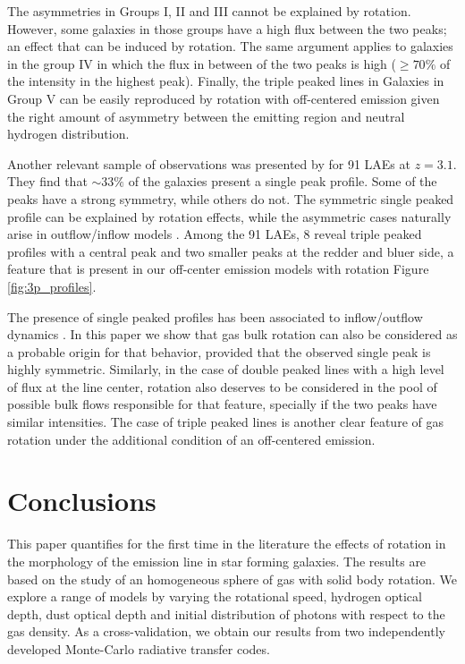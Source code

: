 \documentclass{emulateapj}
\newcommand{\ly}{{\ifmmode{{\rm Ly}\alpha~}\else{Ly$\alpha$~}\fi}}
\begin{document}
The asymmetries in Groups I, II  and III cannot be explained by
rotation. However, some galaxies in those groups have a high flux between
the two peaks; an effect that can be induced by rotation. The same
argument applies to galaxies in the group IV in which the flux
in between of the two peaks is high ($ \geq 70 \%$ of the intensity in
the highest peak). Finally, the triple peaked lines in Galaxies in
Group V can be easily reproduced by rotation with off-centered
emission given the right amount of asymmetry between the emitting
region and neutral hydrogen distribution. 

Another relevant sample of observations was presented by \cite{Yamada2012} 
for 91 LAEs at $z=3.1$. They find that $\sim 33 \%$ of the galaxies present 
a single peak profile. Some of the peaks have a strong symmetry, while
others do not. The symmetric single peaked profile can be explained by
rotation effects, while the asymmetric cases naturally arise in
outflow/inflow models \citep{Verhamme2008, Dijkstra06}. Among the 91
LAEs, 8 reveal triple peaked profiles with a central peak and two
smaller peaks at the redder and bluer side, a feature that is present
in our off-center emission models with rotation Figure \ref{fig:3p_profiles}. 

The presence of single peaked profiles has been associated to
inflow/outflow dynamics \citep{XXX}. In this paper we show that gas
bulk rotation can also be considered as a probable origin for that
behavior, provided that the observed single peak is highly
symmetric. Similarly, in the case of double peaked lines with a high
level of flux at the line center, rotation also deserves to be considered in
the pool of possible bulk flows responsible for that feature,
specially if the two peaks have similar intensities. The case of
triple peaked lines is another clear feature of gas rotation under the
additional condition of an off-centered emission. 

\section{Conclusions}
\label{sec:conclusions}

This paper quantifies for the first time in the literature the effects
of rotation in the morphology of the \ly emission line in star forming
galaxies.  The results are based on the study of an homogeneous sphere
of gas with solid body rotation. We explore a range of models by varying
the rotational speed, hydrogen optical depth, dust optical depth and
initial distribution of \ly photons with respect to the gas
density. As a cross-validation, we obtain our results from two
independently developed Monte-Carlo radiative transfer codes. 
\end{document}
